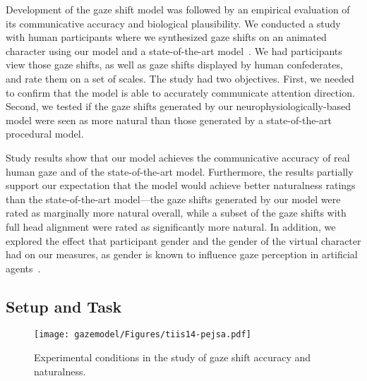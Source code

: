 Development of the gaze shift model was followed by an empirical evaluation of its communicative accuracy and biological plausibility. We conducted a study with human participants where we synthesized gaze shifts on an animated character using our model and a state-of-the-art model~\citep{peters2010animating}. We had participants view those gaze shifts, as well as gaze shifts displayed by human confederates, and rate them on a set of scales. The study had two objectives. First, we needed to confirm that the model is able to accurately communicate attention direction. Second, we tested if the gaze shifts generated by our neurophysiologically-based model were seen as more natural than those generated by a state-of-the-art procedural model.

Study results show that our model achieves the communicative accuracy of real human gaze and of the state-of-the-art model. Furthermore, the results partially support our expectation that the model would achieve better naturalness ratings than the state-of-the-art model---the gaze shifts generated by our model were rated as marginally more natural overall, while a subset of the gaze shifts with full head alignment were rated as significantly more natural. In addition, we explored the effect that participant gender and the gender of the virtual character had on our measures, as gender is known to influence gaze perception in artificial agents~\citep{mutlu2006storytelling}.

\subsection{Setup and Task}

\begin{figure}
  \centering
  \texttt{[image: gazemodel/Figures/tiis14-pejsa.pdf]}
  \caption{Experimental conditions in the study of gaze shift accuracy and naturalness.}
  \label{fig:ModelEvalSetup}
\end{figure}

